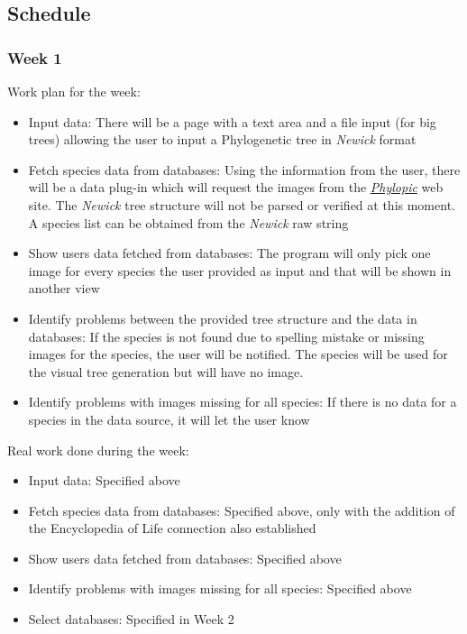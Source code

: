 \documentclass[10pt]{article}
\begin{document}
 \subsection{Schedule}
  \subsubsection{Week 1}
  Work plan for the week:
   \begin{itemize}
    \item Input data: There will be a page with a text area and a file input (for big trees) allowing the user to input a Phylogenetic tree in \textit{Newick} format
    \item Fetch species data from databases: Using the information from the user, there will be a data plug-in which will request the images from the \href{http://www.phylopic.org}{\textit{Phylopic}} web site. The \textit{Newick} tree structure will not be parsed or verified at this moment. A species list can be obtained from the \textit{Newick} raw string
   \item Show users data fetched from databases: The program will only pick one image for every species the user provided as input and that will be shown in another view
   \item Identify problems between the provided tree structure and the data in databases: If the species is not found due to spelling mistake or missing images for the species, the user will be notified. The species will be used for the visual tree generation but will have no image.
   \item Identify problems with images missing for all species: If there is no data for a species in the data source, it will let the user know
   \end{itemize}
   Real work done during the week:
   \begin{itemize}
	   \item Input data: Specified above
	   \item Fetch species data from databases: Specified above, only with the addition of the Encyclopedia of Life connection also established
	   \item Show users data fetched from databases: Specified above
	   \item Identify problems with images missing for all species: Specified above
	   \item Select databases: Specified in Week 2
   \end{itemize}
\end{document}
